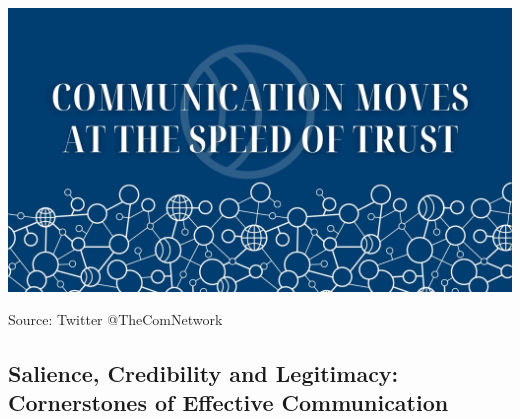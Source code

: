 \documentclass[
]{book}
\begin{document}
\includegraphics{images/m4s1_image1_speedoftrust.jpeg}

Source: Twitter @TheComNetwork

\hypertarget{salience-credibility-and-legitimacy-cornerstones-of-effective-communication}{%
\subsection{Salience, Credibility and Legitimacy: Cornerstones of Effective Communication}\label{salience-credibility-and-legitimacy-cornerstones-of-effective-communication}}
\end{document}
